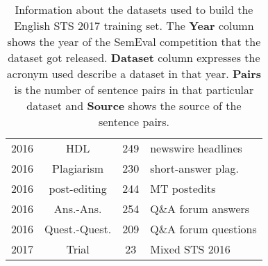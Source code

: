 \begin{enumerate}
\begin{table}[ht!]
\begin{tabular}{c|c|c|l}
 		\hline
 		2016 \cite{agirre-etal-2016-semeval} & HDL & 249 & newswire headlines \\
 		2016 \cite{agirre-etal-2016-semeval} & Plagiarism & 230 & short-answer plag. \\
 		2016 \cite{agirre-etal-2016-semeval} & post-editing & 244 & MT postedits \\
 		2016 \cite{agirre-etal-2016-semeval} & Ans.-Ans. & 254 & Q\&A forum answers \\
 		2016 \cite{agirre-etal-2016-semeval} & Quest.-Quest. & 209 & Q\&A forum questions \\
 		\hline
 		2017 \cite{cer-etal-2017-semeval} & Trial & 23 & Mixed STS 2016 \\
 		\hline
 	\end{tabular}
 	\caption[Information about English STS 2017 training set]{Information about the datasets used to build the English STS 2017 training set. The \textbf{Year} column shows the year of the SemEval competition that the dataset got released. \textbf{Dataset} column expresses the acronym used describe a dataset in that year. \textbf{Pairs} is the number of sentence pairs in that particular dataset and \textbf{Source} shows the source of the sentence pairs. }
 	\label{tab:englishdata_info}
 \end{table}


\end{enumerate}
